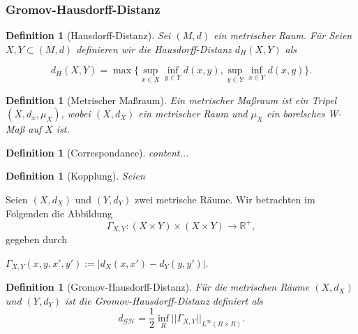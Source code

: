 \documentclass[twoside, 12pt,a4paper]{article}
\def\emph#1{\textit{#1}}
\newtheorem{definition}[theorem]{Definition}
\numberwithin{equation}{section}
\begin{document}
	\subsubsection{Gromov-Hausdorff-Distanz}
	
	\begin{definition}[Hausdorff-Distanz]
		Sei $(M,d)$ ein metrischer Raum.
		Für 
		Seien $X,Y \subset (M,d)$ definieren wir die \emph{Hausdorff-Distanz} $d_H(X,Y)$ als
		
		\begin{equation}
			d_H(X,Y) = \max \lbrace \sup_{x \in X} \inf_{y \in Y} d(x,y), \sup_{y \in Y} \inf_{x \in Y} d(x,y) \rbrace .
		\end{equation} 
		
	\end{definition}

	\begin{definition}[Metrischer Maßraum]
	Ein \emph{metrischer Maßraum} ist ein Tripel $(X,d_x,\mu_X)$, wobei $(X,d_X)$ ein metrischer Raum und $\mu_X$ ein borelsches W-Maß auf $X$ ist.
	\end{definition}

	\begin{definition}[Correspondance]
		content...
	\end{definition}

	\begin{definition}[Kopplung]
	Seien 
	\end{definition}
	
	Seien $(X,d_X)$ und $(Y,d_Y)$ zwei metrische Räume. Wir betrachten im Folgenden die Abbildung
	\begin{equation}
		\Gamma_{X,Y}: (X\times Y) \times (X \times Y) \to \mathbb{R^{+}},
	\end{equation}
	gegeben durch
	
	$\Gamma_{X,Y}(x,y,x',y'):= |d_X(x,x') - d_Y(y,y')|$.
	
	\begin{definition}[Gromov-Hausdorff-Distanz]
	Für die metrischen Räume $(X,d_X)$ und $(Y,d_Y)$ ist die \emph{Gromov-Hausdorff-Distanz} definiert als
	\begin{equation}
		d_{\mathcal{G}\mathcal{H}} = \frac{1}{2}\inf_{R}||\Gamma_{X,Y}||_{L^\infty(R \times R)}.
	\end{equation}
	\end{definition}
	
\end{document}
